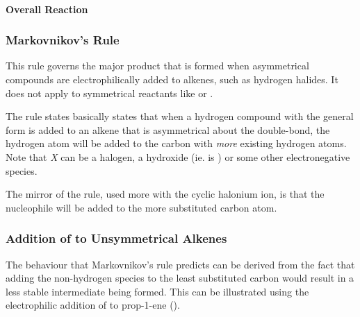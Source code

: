 			\paragraph{Overall Reaction}











		\subsubsection{Markovnikov's Rule}

			This rule governs the major product that is formed when asymmetrical compounds are electrophilically added to alkenes,
			such as hydrogen halides. It does not apply to symmetrical reactants like  or .

			The rule states basically states that when a hydrogen compound with the general form  is added to an
			alkene that is asymmetrical about the double-bond, the hydrogen atom will be added to the carbon with \textit{more}
			existing hydrogen atoms. Note that \textit{X} can be a halogen, a hydroxide (ie.  is ) or some other
			electronegative species.

			The mirror of the rule, used more with the cyclic halonium ion, is that the nucleophile will be added to the more substituted
			carbon atom.











		\pagebreak
		\subsubsection{Addition of  to Unsymmetrical Alkenes}

			The behaviour that Markovnikov's rule predicts can be derived from the fact that adding the non-hydrogen species to the least substituted carbon would
			result in a less stable intermediate being formed. This can be illustrated using the electrophilic addition of
			 to prop-1-ene ().

